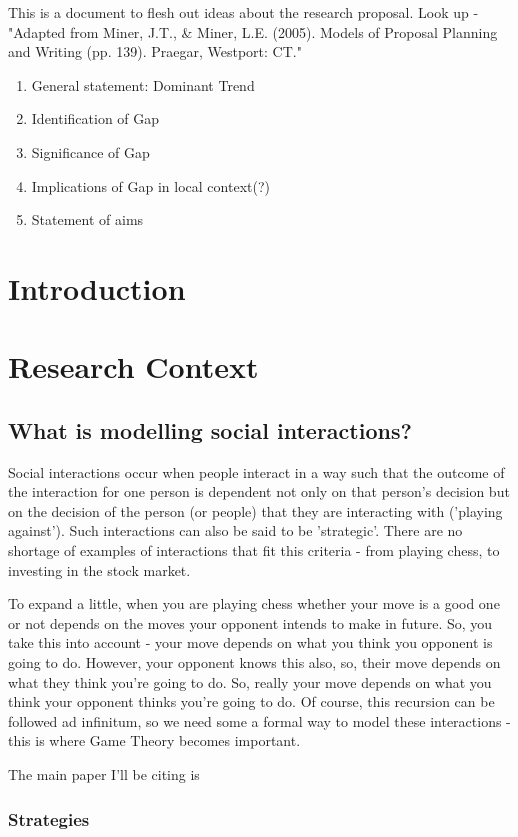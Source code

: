 \documentclass{article}
\begin{document}
This is a document to flesh out ideas about the research proposal. \newline
Look up -  "Adapted from Miner, J.T., \& Miner, L.E. (2005). Models of Proposal Planning and Writing (pp. 139). Praegar, Westport: CT."
\begin{enumerate}
    \item General statement: Dominant Trend
    \item Identification of Gap
    \item Significance of Gap
    \item Implications of Gap in local context(?)
    \item Statement of aims
\end{enumerate}
\section{Introduction}
\section{Research Context}
\subsection{What is modelling social interactions?}
Social interactions occur when people interact in a way such that the outcome of the interaction for
one person is dependent not  only on that person's decision but on the decision of the person (or
people) that they are interacting with ('playing against'). Such interactions can also be said to be
'strategic'. There are no shortage of examples of interactions that fit this criteria - from playing
chess, to investing in the stock market.

To expand a little, when you are playing chess whether your
move is a good one or not depends on the moves your opponent intends to make in future. So, you take
this into account - your move depends on what you think you opponent is going to do. However, your
opponent knows this also, so, their move depends on what they think you're going to do. So, really
your move depends on what you think your opponent thinks you're going to do. Of course, this
recursion can be followed ad infinitum, so we need some a formal way to model these interactions -
this is where Game Theory becomes important.

The main paper I'll be citing is \cite{alger2013homo}

\subsubsection{Strategies}
\end{document}
